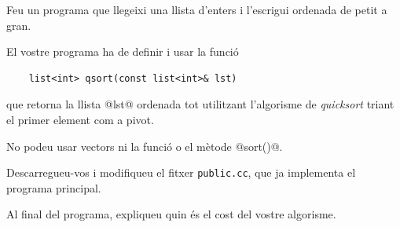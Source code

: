 
\Statement

Feu un programa que llegeixi una llista d'enters i l'escrigui ordenada de petit a gran.

\medskip

El vostre programa ha de definir i usar la funció 

\begin{lstlisting}
    list<int> qsort(const list<int>& lst)
\end{lstlisting}

que retorna la llista @lst@ ordenada tot utilitzant l'algorisme de \emph{quicksort} triant el primer element com a pivot.

\medskip

No podeu usar vectors ni la funció o el mètode @sort()@.

\medskip

Descarregueu-vos i modifiqueu el fitxer \texttt{public.cc}, que ja implementa el programa principal.

\medskip

Al final del programa, expliqueu quin és el cost del vostre algorisme.

\SampleTwoCol